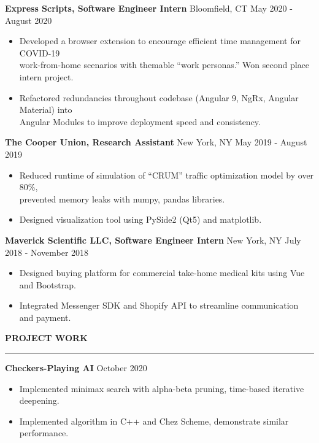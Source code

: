 \documentclass[]{article}
\newcommand{\br}{\vspace{12pt}}
\newcommand{\brs}{\vspace{3pt}}
\newcommand{\hr}{\brs\hrule\brs}
\begin{document}
\brs

\textbf{Express Scripts, Software Engineer Intern}
Bloomfield, CT
\hfill
May 2020 - August 2020
\begin{itemize}
\item Developed a browser extension to encourage efficient time management for
  COVID-19\\ work-from-home scenarios with themable ``work personas.'' Won
  second place intern project.
\item Refactored redundancies throughout codebase (Angular 9, NgRx, Angular
  Material) into\\ Angular Modules to improve deployment speed and consistency.
\end{itemize}

\brs

\textbf{The Cooper Union, Research Assistant}
New York, NY
\hfill
May 2019 - August 2019
\begin{itemize}
\item Reduced runtime of simulation of ``CRUM'' traffic optimization model by
  over 80\%,\\
  prevented memory leaks with numpy, pandas libraries.
\item Designed visualization tool using PySide2 (Qt5) and matplotlib.
\end{itemize}

\brs

\textbf{Maverick Scientific LLC, Software Engineer Intern}
New York, NY
\hfill
July 2018 - November 2018
\begin{itemize}
\item Designed buying platform for commercial take-home medical kits using Vue
  and Bootstrap.
\item Integrated Messenger SDK and Shopify API to streamline communication
  and payment.
\end{itemize}

\br

\textbf{PROJECT WORK}
\hr

\textbf{Checkers-Playing AI}
\hfill
October 2020
\begin{itemize}
\item Implemented minimax search with alpha-beta pruning, time-based iterative
  deepening.
\item Implemented algorithm in C++ and Chez Scheme, demonstrate similar
  performance.
\end{itemize}

\brs
\end{document}
